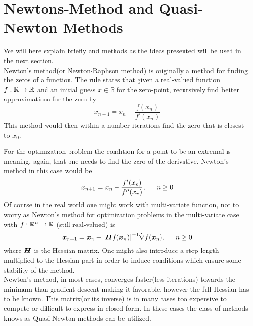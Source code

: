 \section{Newtons-Method and Quasi-Newton
Methods\label{sec:newtons-method_and_quasi-newton_methods}}
    We will here explain briefly  and
     methods as the ideas presented will be used in the
    next section. \\

    Newton's method\cite{linalgDavid}(or Newton-Raphson method) is originally a
    method for finding the zeros of a function. The rule states that given a
    real-valued function $f:\mathbb{R}\rightarrow\mathbb{R}$ and an initial guess
    $x\in\mathbb{R}$ for the zero-point, recursively find better
    approximations for the zero by
        \begin{equation}
            x_{n+1} = x_n - \frac{f(x_n)}{f'(x_n)}
        \end{equation}
    This method would then within a number iterations find the zero that is
    closest to $x_0$.

    For the optimization problem the condition for a point to be an extremal is
     meaning, again, that one needs to find the zero of
    the derivative. Newton's method in this case would be
        \begin{equation}
            x_{n+1} = x_n - \frac{f'(x_n)}{f''(x_n)},\indent n\geq 0
        \end{equation}
    Of course in the real world one might work with multi-variate function, not
    to worry as Newton's method for optimization problems in the multi-variate
    case with $f:\mathbb{R}^n\rightarrow\mathbb{R}$ (still real-valued) is
        \begin{equation}
            \blds{x}_{n+1} = \blds{x}_n -
            \abs{\blds{H}f(\blds{x}_n)}^{-1}\dot\nabla f(\blds{x}_n),\indent
            n\geq 0
        \end{equation}
    where $\boldsymbol{{H}}$ is the Hessian matrix. One might also introduce a
    step-length multiplied to the Hessian part in order to induce
    conditions\cite{numOptNocWrig} which ensure some stability of the method.
    \\

    Newton's method, in most cases, converges faster(less iterations) towards
    the minimum than gradient descent making it favorable, however the full
    Hessian has to be known. This matrix(or its inverse) is in many cases too
    expensive to compute or difficult to express in closed-form. In these cases
    the class of methods knows as Quasi-Newton methods can be utilized. \\

